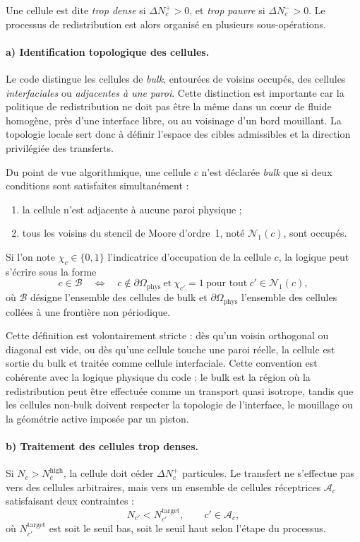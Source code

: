 \documentclass[11pt,a4paper]{article}
\begin{document}
Une cellule est dite \emph{trop dense} si $\Delta N_c^{+}>0$, et \emph{trop pauvre} si $\Delta N_c^{-}>0$. Le processus de redistribution est alors organisé en plusieurs sous-opérations.

\paragraph{a) Identification topologique des cellules.}
Le code distingue les cellules de \emph{bulk}, entourées de voisins occupés, des cellules \emph{interfaciales} ou \emph{adjacentes à une paroi}. Cette distinction est importante car la politique de redistribution ne doit pas être la même dans un cœur de fluide homogène, près d'une interface libre, ou au voisinage d'un bord mouillant. La topologie locale sert donc à définir l'espace des cibles admissibles et la direction privilégiée des transferts.

Du point de vue algorithmique, une cellule $c$ n'est déclarée \emph{bulk} que si deux conditions sont satisfaites simultanément :
\begin{enumerate}[label=(\roman*)]
  \item la cellule n'est adjacente à aucune paroi physique ;
  \item tous les voisins du stencil de Moore d'ordre~1, noté $\mathcal{N}_1(c)$, sont occupés.
\end{enumerate}
Si l'on note $\chi_c\in\{0,1\}$ l'indicatrice d'occupation de la cellule $c$, la logique peut s'écrire sous la forme
\begin{equation}
  c\in\mathcal{B}
  \quad \Longleftrightarrow \quad
  c\notin\partial\Omega_{\mathrm{phys}}
  \ \text{et}\ 
  \chi_{c'}=1 \ \text{pour tout}\ c'\in\mathcal{N}_1(c),
\end{equation}
où $\mathcal{B}$ désigne l'ensemble des cellules de bulk et $\partial\Omega_{\mathrm{phys}}$ l'ensemble des cellules collées à une frontière non périodique.

Cette définition est volontairement stricte : dès qu'un voisin orthogonal ou diagonal est vide, ou dès qu'une cellule touche une paroi réelle, la cellule est sortie du bulk et traitée comme cellule interfaciale. Cette convention est cohérente avec la logique physique du code : le bulk est la région où la redistribution peut être effectuée comme un transport quasi isotrope, tandis que les cellules non-bulk doivent respecter la topologie de l'interface, le mouillage ou la géométrie active imposée par un piston.

\paragraph{b) Traitement des cellules trop denses.}
Si $N_c > N_c^{\mathrm{high}}$, la cellule doit céder $\Delta N_c^{+}$ particules. Le transfert ne s'effectue pas vers des cellules arbitraires, mais vers un ensemble de cellules réceptrices $\mathcal{A}_c$ satisfaisant deux contraintes :
\begin{equation}
  N_{c'} < N_{c'}^{\mathrm{target}},
  \qquad c'\in\mathcal{A}_c,
\end{equation}
où $N_{c'}^{\mathrm{target}}$ est soit le seuil bas, soit le seuil haut selon l'étape du processus.
\end{document}
